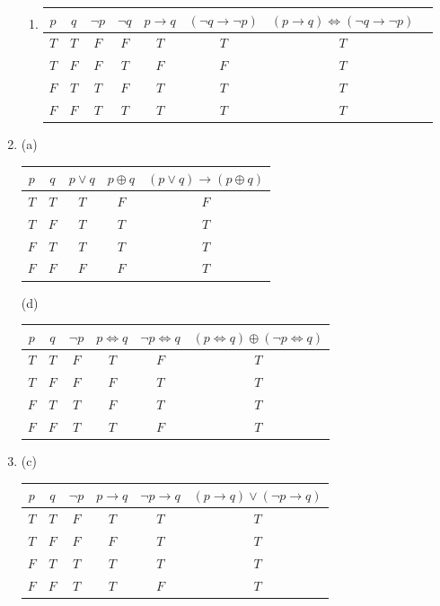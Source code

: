 \documentclass{article}
\begin{document}
\begin{enumerate}
\begin{enumerate}
  \item
	\begin{tabular}{|c|c|c|c|c|c|c|c|}
	\hline
	$p$ & $q$ & $\neg p$ & $\neg q$ & $p \rightarrow q$ & $(\neg q \rightarrow \neg p)$ & $(p \rightarrow q) \iff (\neg q \rightarrow \neg p)$ \\ \hline
	$T$ & $T$ & $F$ & $F$ & $T$ & $T$ & $T$ \\ \hline	
	$T$ & $F$ & $F$ & $T$ & $F$ & $F$ & $T$ \\ \hline	
	$F$ & $T$ & $T$ & $F$ & $T$ & $T$ & $T$ \\ \hline	
	$F$ & $F$ & $T$ & $T$ & $T$ & $T$ & $T$ \\ \hline
	\end{tabular}
 \end{enumerate}

\item
 (a) \begin{tabular}{|c|c|c|c|c|}
 	\hline
	$p$ & $q$ & $p \lor q$ & $p \oplus q$ & $(p \lor q) \rightarrow (p \oplus q)$ \\ \hline
	$T$ & $T$ & $T$ & $F$ & $F$ \\ \hline	
	$T$ & $F$ & $T$ & $T$ & $T$ \\ \hline	
	$F$ & $T$ & $T$ & $T$ & $T$ \\ \hline	
	$F$ & $F$ & $F$ & $F$ & $T$ \\ \hline
     \end{tabular}

 (d) \begin{tabular}{|c|c|c|c|c|c|}
 	\hline
	$p$ & $q$ & $\neg p$ & $p \iff q$ & $\neg p \iff q$ & $(p \iff q) \oplus (\neg p \iff q)$ \\ \hline
	$T$ & $T$ & $F$ & $T$ & $F$ & $T$ \\ \hline	
	$T$ & $F$ & $F$ & $F$ & $T$ & $T$ \\ \hline	
	$F$ & $T$ & $T$ & $F$ & $T$ & $T$ \\ \hline	
	$F$ & $F$ & $T$ & $T$ & $F$ & $T$ \\ \hline
	\end{tabular}
\item
 (c) \begin{tabular}{|c|c|c|c|c|c|}
 	\hline
	$p$ & $q$ & $\neg p$ & $p \rightarrow q$ & $\neg p \rightarrow q$ & $(p \rightarrow q) \lor (\neg p \rightarrow q)$ \\ \hline
	$T$ & $T$ & $F$ & $T$ & $T$ & $T$ \\ \hline	
	$T$ & $F$ & $F$ & $F$ & $T$ & $T$ \\ \hline	
	$F$ & $T$ & $T$ & $T$ & $T$ & $T$ \\ \hline	
	$F$ & $F$ & $T$ & $T$ & $F$ & $T$ \\ \hline
	\end{tabular}


\end{enumerate}
\end{document}

